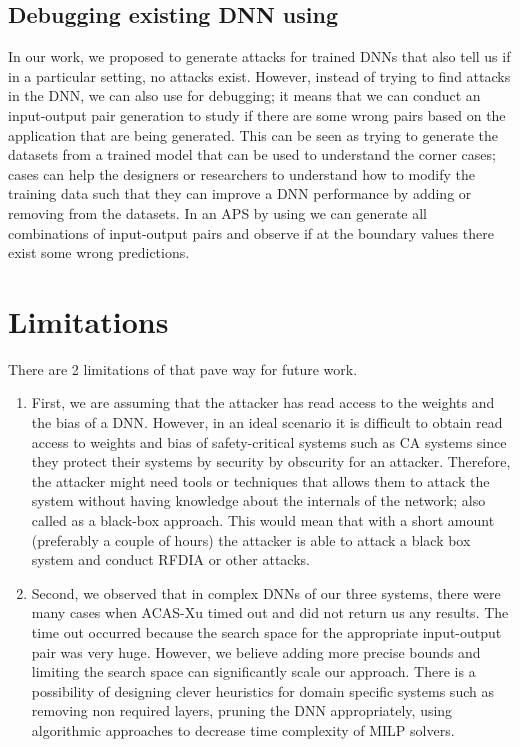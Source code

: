 \subsection{Debugging existing DNN using \tool}
In our work, we proposed \tool to generate attacks for trained \ac{DNN}s that also tell us if in a particular setting, no attacks exist. 
However, instead of trying to find attacks in the \ac{DNN}, we can also use \tool for debugging; it means that we can conduct an input-output pair generation to study if there are some wrong pairs based on the application that are being generated. 
This can be seen as trying to generate the datasets from a trained model that can be used to understand the corner cases; cases can help the designers or researchers to understand how to modify the training data such that they can improve a \ac{DNN} performance by adding or removing from the datasets.
In an \ac{APS} by using \tool we can generate all combinations of input-output pairs and observe if at the boundary values there exist some wrong predictions. 





\section{ Limitations}

There are 2 limitations of \tool that pave way for future work. 
\begin{enumerate}
	\item First, we are assuming that the attacker has read access to the weights and the bias of a \ac{DNN}.
	However, in an ideal scenario it is difficult to obtain read access to weights and bias of safety-critical systems such as \ac{CA} systems since they protect their systems by security by obscurity for an attacker. 
	Therefore, the attacker might need tools or techniques that allows them to attack the system without having knowledge about the internals of the network; also called as a black-box approach. 
	This would mean that with a short amount (preferably a couple of hours) the attacker is able to attack a black box system and conduct \ac{RFDIA} or other attacks. 
	\item Second, we observed that in complex \ac{DNN}s of our three systems, there were many cases when  \ac{ACAS-Xu} timed out and did not return us any results. 
	The time out occurred because the search space for the appropriate input-output pair was very huge. 
	However, we believe adding more precise bounds and limiting the search space can significantly scale our approach. 
	There is a possibility of designing clever heuristics for domain specific systems such as removing non required layers, pruning the \ac{DNN} appropriately, using algorithmic approaches to decrease time complexity of \ac{MILP} solvers. 
	
	\label{section:limitations}
	
\end{enumerate}

